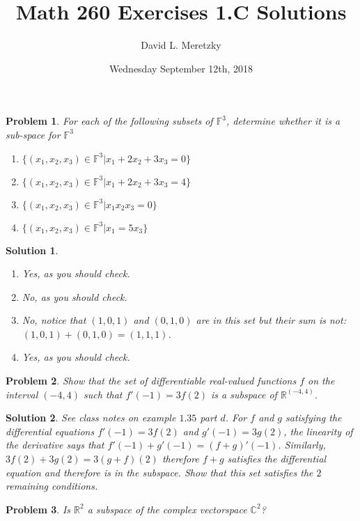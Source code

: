 \documentclass{article}
\title{ \vspace{-10ex} %
Math 260 Exercises 1.C Solutions
}
\author{David L. Meretzky
}
\date{%
Wednesday September 12th, 2018
}
\theoremstyle{problemstyle}
\newtheorem{problem}{Problem}
\theoremstyle{problemstyle}
\newtheorem{solution}{Solution}
\begin{document}
\maketitle

\begin{problem}
For each of the following subsets of $\mathbb{F}^3$, determine whether it is a sub-space for $\mathbb{F}^3$
\begin{enumerate}
\item $\{(x_1,x_2,x_3) \in \mathbb{F}^3 |x_1 + 2x_2 + 3x_3 = 0 \}$
\item $\{(x_1,x_2,x_3) \in \mathbb{F}^3 |x_1 + 2x_2 + 3x_3 = 4 \}$
\item $\{(x_1,x_2,x_3) \in \mathbb{F}^3 |x_1x_2x_3 = 0 \}$
\item $\{(x_1,x_2,x_3) \in \mathbb{F}^3 |x_1  = 5x_3 \}$
\end{enumerate}
\end{problem}

\begin{solution}
\begin{enumerate}
\item Yes, as you should check. 
\item No, as you should check. 
\item No, notice that $(1,0,1)$ and $(0,1,0)$ are in this set but their sum is not: $(1,0,1) + (0,1,0) = (1,1,1)$. 
\item Yes, as you should check. 
\end{enumerate}
\end{solution}

\begin{problem}
Show that the set of differentiable real-valued functions $f$ on the interval $(-4,4)$ such that $f'(-1) = 3f(2)$ is a subspace of $\mathbb{R}^{(-4,4)}$.
\end{problem}
\begin{solution}
See class notes on example $1.35$ part $d$. For $f$ and $g$ satisfying the differential equations $f'(-1) = 3f(2)$ and $g'(-1) = 3g(2)$, the linearity of the derivative says that $f'(-1) + g'(-1) = (f+g)'(-1)$. Similarly, $3f(2)+3g(2) = 3(g+f)(2)$ therefore $f+g$ satisfies the differential equation and therefore is in the subspace. Show that this set satisfies the $2$ remaining conditions.
\end{solution}

\begin{problem}
Is $\mathbb{R}^2$ a subspace of the complex vectorspace $\mathbb{C}^2$?
\end{problem}
\end{document}
